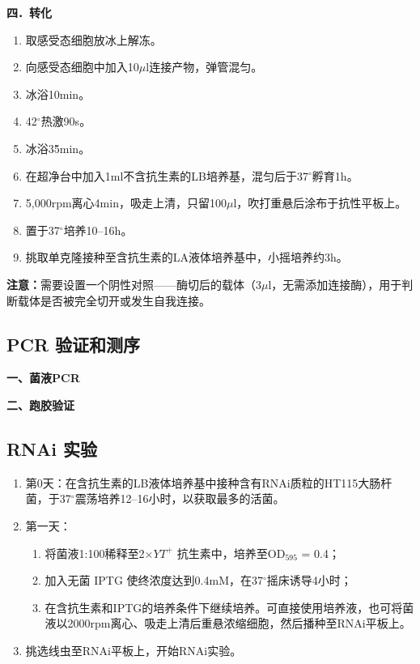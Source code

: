 \textbf{四．转化}

\begin{enumerate}[itemsep=0.1em]
  \item 取感受态细胞放冰上解冻。
  \item 向感受态细胞中加入10$\mu$l连接产物，弹管混匀。
  \item 冰浴10min。
  \item 42$^\circ$热激90s。
  \item 冰浴3\~5min。
  \item 在超净台中加入1ml不含抗生素的LB培养基，混匀后于37$^\circ$孵育1h。
  \item 5,000rpm离心4min，吸走上清，只留100$\mu$l，吹打重悬后涂布于抗性平板上。
  \item 置于37$^\circ$培养10–16h。
  \item 挑取单克隆接种至含抗生素的LA液体培养基中，小摇培养约3h。
\end{enumerate}

\textbf{注意：}需要设置一个阴性对照——酶切后的载体（3$\mu$l，无需添加连接酶），用于判断载体是否被完全切开或发生自我连接。

\subsection{PCR 验证和测序}

\textbf{一、菌液PCR}

\textbf{二、跑胶验证}

\subsection{RNAi 实验}

\begin{enumerate}[itemsep=0.3em]

  \item 第0天：在含抗生素的LB液体培养基中接种含有RNAi质粒的HT115大肠杆菌，于37$^\circ$震荡培养12–16小时，以获取最多的活菌。
  
  \item 第一天：
  \begin{enumerate}[label*={（\alph*）}, itemsep=0.3em]
    \item 将菌液1:100稀释至2$\times YT ^+$ 抗生素中，培养至OD$_{595}$ = 0.4；
    \item 加入无菌 IPTG 使终浓度达到0.4mM，在37$^\circ$摇床诱导4小时；
    \item 在含抗生素和IPTG的培养条件下继续培养。可直接使用培养液，也可将菌液以2000rpm离心、吸走上清后重悬浓缩细胞，然后播种至RNAi平板上。
  \end{enumerate}
  
  \item 挑选线虫至RNAi平板上，开始RNAi实验。
  
\end{enumerate}

